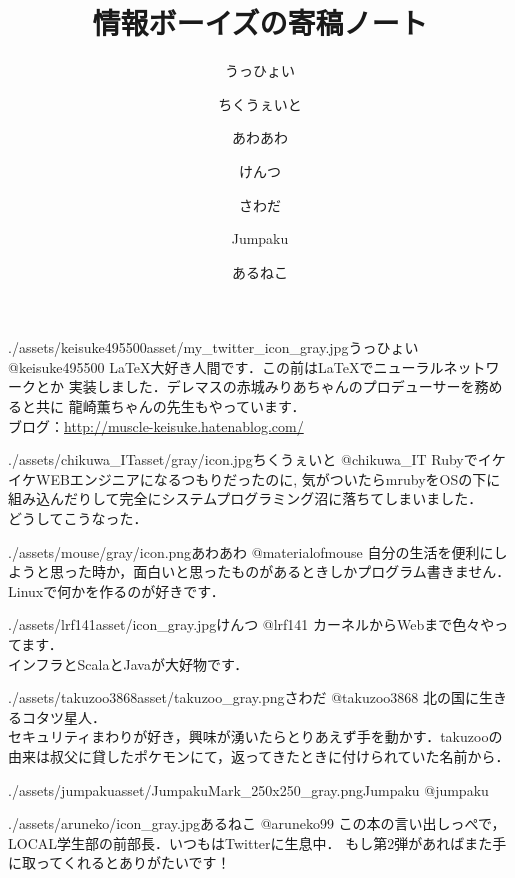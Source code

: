 \documentclass[autodetect-engine,dvipdfmx-if-dvi,ja=standard,b5paper,10.5pt,twoside,openany,layout=v2]{bxjsbook}
\title{情報ボーイズの寄稿ノート}
\author{うっひょい \and ちくうぇいと \and あわあわ \and けんつ \and さわだ \and Jumpaku \and あるねこ}
\date{}
\newcommand{\assetspath}{./assets}
\newcommand{\jumpakuasset}{\assetspath/jumpakuasset}
\newcommand{\takuzooasset}{\assetspath/takuzoo3868asset}
\newcommand{\lrfasset}{\assetspath/lrf141asset}
\newcommand{\materialofmouseasset}{\assetspath/mouse/gray}
\newcommand{\keisukeasset}{\assetspath/keisuke495500asset}
\newcommand{\chikuwaitasset}{\assetspath/chikuwa_ITasset/gray}
\begin{document}
\frontmatter
\maketitle
\begin{myintroduce}{\keisukeasset/my_twitter_icon_gray.jpg}{うっひょい @keisuke495500}
  \LaTeX 大好き人間です．この前は\LaTeX でニューラルネットワークとか
  実装しました．デレマスの赤城みりあちゃんのプロデューサーを務めると共に
  龍崎薫ちゃんの先生もやっています．\\
  ブログ：\url{http://muscle-keisuke.hatenablog.com/}
\end{myintroduce}
\begin{myintroduce}{\chikuwaitasset/icon.jpg}{ちくうぇいと @chikuwa\_IT}
  RubyでイケイケWEBエンジニアになるつもりだったのに, 気がついたらmrubyをOSの下に組み込んだりして完全にシステムプログラミング沼に落ちてしまいました．\\
  どうしてこうなった．
\end{myintroduce}
\begin{myintroduce}{\materialofmouseasset/icon.png}{あわあわ @materialofmouse}
  自分の生活を便利にしようと思った時か，面白いと思ったものがあるときしかプログラム書きません．
  Linuxで何かを作るのが好きです．
\end{myintroduce}
\begin{myintroduce}{\lrfasset/icon_gray.jpg}{けんつ @lrf141}
  カーネルからWebまで色々やってます．\\
  インフラとScalaとJavaが大好物です．
\end{myintroduce}
\begin{myintroduce}{\takuzooasset/takuzoo_gray.png}{さわだ @takuzoo3868}
  北の国に生きるコタツ星人．\\
  セキュリティまわりが好き，興味が湧いたらとりあえず手を動かす．takuzooの由来は叔父に貸したポケモンにて，返ってきたときに付けられていた名前から．
\end{myintroduce}
\begin{myintroduce}{\jumpakuasset/JumpakuMark_250x250_gray.png}{Jumpaku @jumpaku}

\end{myintroduce}

\begin{myintroduce}{./assets/aruneko/icon_gray.jpg}{あるねこ @aruneko99}
  この本の言い出しっぺで，LOCAL学生部の前部長．いつもはTwitterに生息中．
  もし第2弾があればまた手に取ってくれるとありがたいです！
\end{myintroduce}
\end{document}
